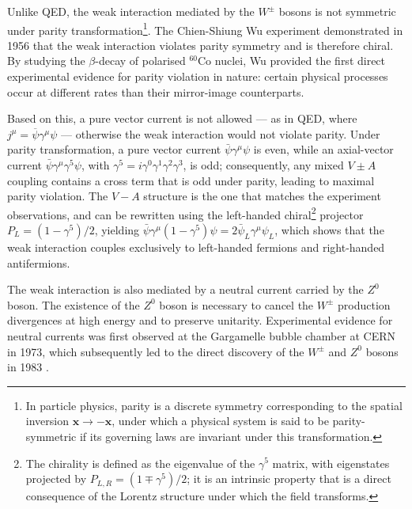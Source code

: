 \vspace{0.5 cm}

Unlike QED, the weak interaction mediated by the $W^\pm$ bosons is not symmetric under parity transformation\footnote{In particle physics, parity is a discrete symmetry corresponding to the spatial inversion $\mathbf{x} \to -\mathbf{x}$, under which a physical system is said to
be parity-symmetric if its governing laws are invariant under this transformation.}. The Chien-Shiung Wu experiment \cite{Wu1957} demonstrated in 1956 that the weak interaction violates parity symmetry and is therefore chiral. By studying the $\beta$-decay of polarised $^{60}$Co nuclei, Wu provided the first direct experimental evidence for parity violation in nature: certain physical processes occur at different rates than their mirror-image counterparts.

Based on this, a pure vector current is not allowed --- as in QED, where $j^\mu=\overline{\psi}\gamma^\mu\psi$ --- otherwise the weak interaction would not violate parity. Under parity transformation, a pure vector current $\bar{\psi}\gamma^\mu\psi$ is even, while an axial-vector current $\bar{\psi}\gamma^\mu\gamma^5\psi$, with  $\gamma^5=i\gamma^0\gamma^1\gamma^2\gamma^3$, is odd; consequently, any mixed $V \pm A$ coupling contains a cross term that is odd under parity, leading to maximal parity violation. The $V-A$ structure is the one that matches the experiment observations, and can be rewritten using the left-handed chiral\footnote{The chirality is defined as the eigenvalue of the $\gamma^5$ matrix, with eigenstates projected by $P_{L,R} = (1 \mp \gamma^5)/2$; it is an intrinsic property that is a direct consequence of the Lorentz structure under which the field transforms.} projector $P_L = (1 - \gamma^5)/2$, yielding $\bar{\psi}\gamma^\mu(1-\gamma^5)\psi = 2\bar{\psi}_L\gamma^\mu\psi_L$, which shows that the weak interaction couples exclusively to left-handed fermions and right-handed antifermions.

\vspace{0.5 cm}

The weak interaction is also mediated by a neutral current carried by the $Z^0$ boson. The existence of the $Z^0$ boson is necessary to cancel the $W^\pm$ production divergences at high energy and to preserve unitarity. Experimental evidence for neutral currents was first observed at the Gargamelle bubble chamber at CERN in 1973, which subsequently led to the direct discovery of the $W^\pm$ and $Z^0$ bosons in 1983 \cite{WandZ}.

